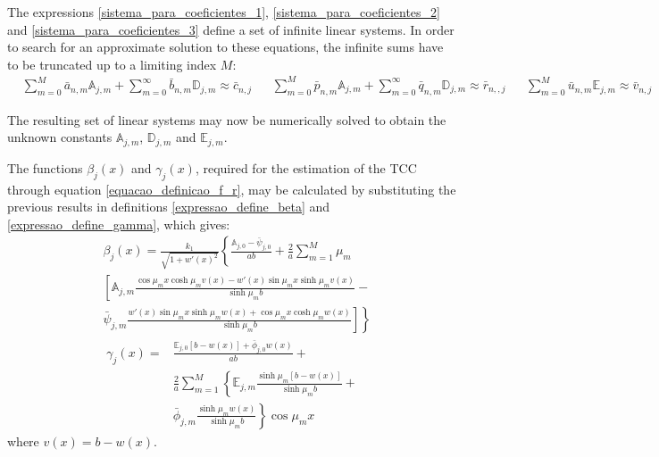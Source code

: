\documentclass[conference,compsoc,fleqn]{IEEEtran}
\begin{document}
The expressions \eqref{sistema_para_coeficientes_1}, \eqref{sistema_para_coeficientes_2} and \eqref{sistema_para_coeficientes_3} define a set of infinite linear systems. In order to search for an approximate solution to these equations, the infinite sums have to be truncated up to a limiting index $M$:
\begin{subequations}
	\begin{align}
	& \sum_{m = 0}^M \bar{a}_{n,m} \mathbb{A}_{j,m} + \sum_{m = 0}^\infty \bar{b}_{n,m} \mathbb{D}_{j,m} \approx \bar{c}_{n,j} \label{sistema_para_coeficientes_1a}
	\end{align}
	\begin{align}
	& \sum_{m = 0}^M \bar{p}_{n,m} \mathbb{A}_{j,m} + \sum_{m = 0}^\infty \bar{q}_{n,m} \mathbb{D}_{j,m} \approx \bar{r}_{n,,j} \label{sistema_para_coeficientes_2a}
	\end{align}
	\begin{align}
	& \sum_{m = 0}^M \bar{u}_{n,m} \mathbb{E}_{j,m} \approx \bar{v}_{n,j} \label{sistema_para_coeficientes_3a}
	\end{align}
\end{subequations}

The resulting set of linear systems may now be numerically solved to obtain the unknown constants $\mathbb{A}_{j,m}$, $\mathbb{D}_{j,m}$ and $\mathbb{E}_{j,m}$.

The functions $\beta_j(x)$ and $\gamma_j(x)$, required for the estimation of the TCC through equation \eqref{equacao_definicao_f_r}, may be calculated by substituting the previous results in definitions \eqref{expressao_define_beta} and \eqref{expressao_define_gamma}, which gives:
\begin{align}
& \beta_j(x) = \frac{k_1}{\sqrt{1 + w'(x)^2}}\left\lbrace \frac{\mathbb{A}_{j,0} - \bar{\psi}_{j,0}}{ab} +
\frac{2}{a}\sum_{m=1}^M \mu_m \right. \nonumber \\
& \left[ \mathbb{A}_{j,m}\frac{\scriptstyle\cos\mu_m x\cosh\mu_m v(x) - w'(x)\sin\mu_m x\sinh\mu_m v(x)}{\scriptstyle\sinh\mu_m b} \right. - \nonumber \\
&\left. \left. \bar{\psi}_{j, m}\frac{\scriptstyle w'(x)\sin\mu_m x\sinh\mu_m w(x) + \cos\mu_m x\cosh\mu_m w(x)}{\scriptstyle\sinh\mu_m b}\right] \right\rbrace
\label{serie_para_beta}
\end{align}
\begin{align}
\gamma_j(x) = & \frac{\mathbb{E}_{j,0}[b - w(x)] + \bar{\phi}_{j,0}w(x)}{ab} + \nonumber \\
& \frac{2}{a}\sum_{m=1}^M \left\lbrace\mathbb{E}_{j,m}\frac{\sinh\mu_m [b - w(x)]}{\sinh\mu_m b} + \right. \nonumber \\
& \left. \bar{\phi}_{j, m}\frac{\sinh\mu_m w(x)}{\sinh\mu_m b}\right\rbrace \cos\mu_m x
\label{serie_para_gamma}
\end{align} 
where $v(x) = b - w(x)$.
\\
\end{document}
